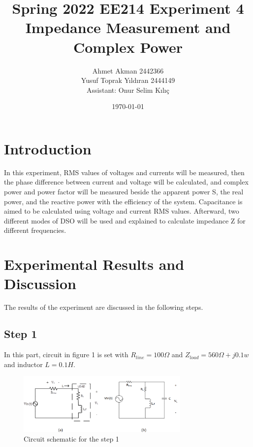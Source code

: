 \documentclass[letterpaper,12pt]{article}
\begin{document}
\thispagestyle{empty}

\title{Spring 2022 EE214 Experiment 4  \protect\\ Impedance Measurement and Complex Power}
\author{Ahmet Akman 2442366 \protect\\ Yusuf Toprak Yıldıran 2444149 \protect\\ Assistant: Onur Selim Kılıç}
\date{\today}
\maketitle
\tableofcontents
\section{Introduction}
In this experiment, RMS values of voltages and currents will be measured, then the phase difference between current and voltage will be calculated, and complex power and power factor will be measured beside the apparent power S, the real power, and the reactive power with the efficiency of the system. Capacitance is aimed to be calculated using voltage and current RMS values. Afterward, two different modes of DSO will be used and explained to calculate impedance Z for different frequencies.

\section{Experimental Results and Discussion}
The results of the experiment are discussed in the following steps.
%
\subsection{Step 1}

In this part, circuit in figure 1 is set with \(R_{line}= 100\Omega\) and \(Z_{load}= 560\Omega + j0.1w\) and inductor \(L= 0.1H\).

\begin{figure}[H]
    \centering
    \includegraphics[width = 0.75\textwidth]{1SCH.png}
    \caption{Circuit schematic for the step 1}
\end{figure} 
\end{document}
